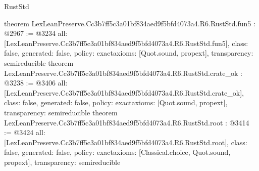 \begin{lexlean}{RustStd}
\begin{coremodule}
{}
theorem LexLeanPreserve.Cc3b7ff5c3a01bf834aed9f5bfd4073a4.R6.RustStd.fun5 : @2967 := @3234 {
  all: [LexLeanPreserve.Cc3b7ff5c3a01bf834aed9f5bfd4073a4.R6.RustStd.fun5],
  class: false,
  generated: false,
  policy: exact{axioms: [Quot.sound, propext]},
  transparency: semireducible
}
theorem LexLeanPreserve.Cc3b7ff5c3a01bf834aed9f5bfd4073a4.R6.RustStd.crate_ok : @3238 := @3406 {
  all: [LexLeanPreserve.Cc3b7ff5c3a01bf834aed9f5bfd4073a4.R6.RustStd.crate_ok],
  class: false,
  generated: false,
  policy: exact{axioms: [Quot.sound, propext]},
  transparency: semireducible
}
theorem LexLeanPreserve.Cc3b7ff5c3a01bf834aed9f5bfd4073a4.R6.RustStd.root : @3414 := @3424 {
  all: [LexLeanPreserve.Cc3b7ff5c3a01bf834aed9f5bfd4073a4.R6.RustStd.root],
  class: false,
  generated: false,
  policy: exact{axioms: [Classical.choice, Quot.sound, propext]},
  transparency: semireducible
}


\end{coremodule}
\end{lexlean}
